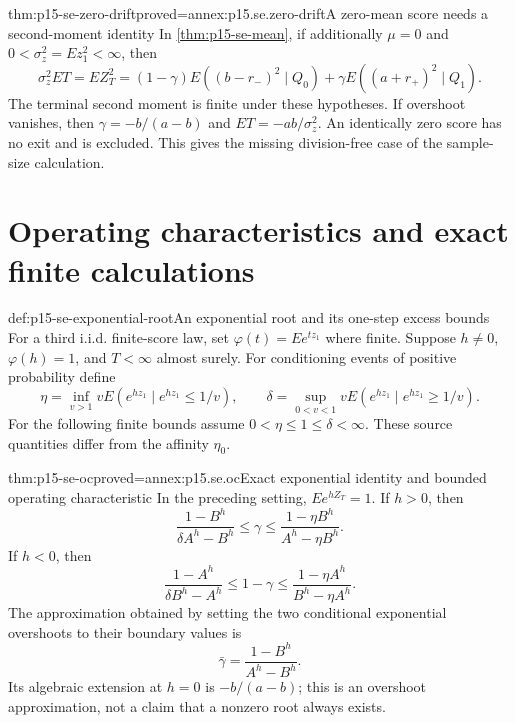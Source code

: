 \begin{hbtheorem}{thm:p15-se-zero-drift}{proved=annex:p15.se.zero-drift}{A zero-mean score needs a second-moment identity}
In \cref{thm:p15-se-mean}, if additionally \(\mu=0\) and
\(0<\sigma_z^2=Ez_1^2<\infty\),
then
\[
 \sigma_z^2ET=EZ_T^2
 =(1-\gamma)E((b-r_-)^2\mid Q_0)
       +\gamma E((a+r_+)^2\mid Q_1).
\]
The terminal second moment is finite under these hypotheses.
If overshoot vanishes, then
\(\gamma=-b/(a-b)\) and \(ET=-ab/\sigma_z^2\).
An identically zero score has no exit and is excluded. This gives the
missing division-free case of the sample-size calculation.
\end{hbtheorem}

\section{Operating characteristics and exact finite calculations}
\label{sec:p15-se-operating-characteristics}

\begin{hbdefinition}{def:p15-se-exponential-root}{An exponential root and its one-step excess bounds}
For a third i.i.d. finite-score law, set \(\varphi(t)=Ee^{tz_1}\)
where finite. Suppose \(h\ne0\), \(\varphi(h)=1\), and
\(T<\infty\) almost surely. For conditioning events of positive
probability define
\[
 \eta=\inf_{v>1}vE(e^{hz_1}\mid e^{hz_1}\leq1/v),\qquad
 \delta=\sup_{0<v<1}vE(e^{hz_1}\mid e^{hz_1}\geq1/v).
\]
For the following finite bounds assume \(0<\eta\leq1\leq\delta<\infty\).
These source quantities differ from the affinity \(\eta_0\).
\end{hbdefinition}

\begin{hbtheorem}{thm:p15-se-oc}{proved=annex:p15.se.oc}{Exact exponential identity and bounded operating characteristic}
In the preceding setting, \(Ee^{hZ_T}=1\). If \(h>0\), then
\[
 \frac{1-B^h}{\delta A^h-B^h}
 \leq\gamma\leq
 \frac{1-\eta B^h}{A^h-\eta B^h}.
\]
If \(h<0\), then
\[
 \frac{1-A^h}{\delta B^h-A^h}
 \leq1-\gamma\leq
 \frac{1-\eta A^h}{B^h-\eta A^h}.
\]
The approximation obtained by setting the two conditional exponential
overshoots to their boundary values is
\[
 \bar\gamma=\frac{1-B^h}{A^h-B^h}.
\]
Its algebraic extension at \(h=0\) is \(-b/(a-b)\); this is an
overshoot approximation, not a claim that a nonzero root always exists.
\cite[Section 3.4, equations (3.32)--(3.44)]{Wald1945SequentialTests}
\end{hbtheorem}

